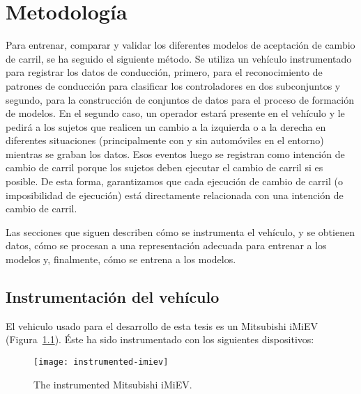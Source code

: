 \chapter{Metodología}
\label{ch:methodology}


Para entrenar, comparar y validar los diferentes modelos de aceptación de cambio de carril, se ha seguido el siguiente método. Se utiliza un vehículo instrumentado para registrar los datos de conducción, primero, para el reconocimiento de patrones de conducción para clasificar los controladores en dos subconjuntos y segundo, para la construcción de conjuntos de datos para el proceso de formación de modelos. En el segundo caso, un operador estará presente en el vehículo y le pedirá a los sujetos que realicen un cambio a la izquierda o a la derecha en diferentes situaciones (principalmente con y sin automóviles en el entorno) mientras se graban los datos. Esos eventos luego se registran como intención de cambio de carril porque los sujetos deben ejecutar el cambio de carril si es posible. De esta forma, garantizamos que cada ejecución de cambio de carril (o imposibilidad de ejecución) está directamente relacionada con una intención de cambio de carril.

Las secciones que siguen describen cómo se instrumenta el vehículo, y se obtienen datos, cómo se procesan a una representación adecuada para entrenar a los modelos y, finalmente, cómo se entrena a los modelos.

\section{Instrumentación del vehículo}

El vehiculo usado para el desarrollo de esta tesis es un Mitsubishi iMiEV (Figura~\ref{fig:instrumented-imiev}). Éste ha sido instrumentado con los siguientes dispositivos:

\begin{figure}
	\texttt{[image: instrumented-imiev]}
	\caption{The instrumented Mitsubishi iMiEV.}
	\label{fig:instrumented-imiev}
\end{figure}


